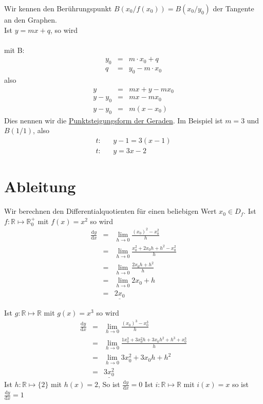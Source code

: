 \documentclass{report}
\begin{document}
Wir kennen den Berührungspunkt $B(x_0 / f(x_0)) = B (x_0 / y_0)$ der Tangente an den Graphen.\\
Ist $y = mx + q$, so wird\\\\
mit B: \begin{eqnarray}y_0 & = & m \cdot x_0 + q \nonumber \\
q & = & y_0 - m \cdot x_0\end{eqnarray}
also
\begin{eqnarray}y & = & mx + y - mx_0 \nonumber \\
y - y_0 & = & mx - mx_0 \nonumber \\
y - y_0 & = & m(x - x_0) \end{eqnarray}
Dies nennen wir die \underline{Punktsteigungsform der Geraden}. Im Beispiel ist $m = 3$ und $B(1/1)$, also
\begin{eqnarray}t:& & y - 1 = 3(x-1) \nonumber \\
t: & & y = 3x -2\end{eqnarray}

\section{Ableitung}
Wir berechnen den Differentialquotienten für einen beliebigen Wert $x_0 \in D_f$. 
Ist $f:\mathbb{R} \mapsto \mathbb{R}_0^+$ mit $f(x) = x^2$ so wird \begin{eqnarray}
 \frac{\mathrm{d}y}{\mathrm{d}x} & = & \lim_{h \to 0} \frac{(x_0)^2 - x_0^2}{h} \nonumber \\
 & = & \lim_{h \to 0} \frac{x_0^2 + 2x_0h + h^2 -x_0^2}{h}  \nonumber \\
 & = & \lim_{h \to 0} \frac{2x_0h + h^2}{h}  \nonumber \\
 & = & \lim_{h \to 0} 2x_0 + h \nonumber \\
 & = & \underline{2x_0} \end{eqnarray}

Ist $ g:\mathbb{R} \mapsto \mathbb{R}$ mit $ g(x) = x^3$ so wird \begin{eqnarray}
\frac{\mathrm{d}y}{\mathrm{d}x} & = & \lim_{h \to 0} \frac{(x_0)^3 - x_0^3}{h} \nonumber \\
& = & \lim_{h \to 0} \frac{1x_0^3 + 3x_0^2h + 3 x_0h^2 + h^3 + x_0^3}{h} \nonumber \\
& = & \lim_{h \to 0} 3x_0^2 + 3x_0h + h^2  \nonumber \\
& = & \underline{3x_0^2} \end{eqnarray}
Ist $ h:\mathbb{R} \mapsto \{2\}$ mit $ h(x) = 2$, %
So ist $ \frac{\mathrm{d}y}{\mathrm{d}x} = 0$
Ist $ i:\mathbb{R} \mapsto \mathbb{R}$ mit $ i(x) = x$ %
so ist $\frac{\mathrm{d}y}{\mathrm{d}x} = 1$
\end{document}

